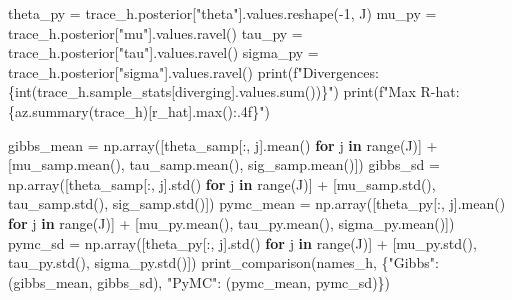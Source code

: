 \documentclass[
  letterpaper,
  DIV=11,
  numbers=noendperiod]{scrartcl}
\newenvironment{Shaded}{\begin{snugshade}}{\end{snugshade}}
\newcommand{\BuiltInTok}[1]{\textcolor[rgb]{0.00,0.23,0.31}{#1}}
\newcommand{\ControlFlowTok}[1]{\textcolor[rgb]{0.00,0.23,0.31}{\textbf{#1}}}
\newcommand{\DecValTok}[1]{\textcolor[rgb]{0.68,0.00,0.00}{#1}}
\newcommand{\KeywordTok}[1]{\textcolor[rgb]{0.00,0.23,0.31}{\textbf{#1}}}
\newcommand{\NormalTok}[1]{\textcolor[rgb]{0.00,0.23,0.31}{#1}}
\newcommand{\OperatorTok}[1]{\textcolor[rgb]{0.37,0.37,0.37}{#1}}
\newcommand{\SpecialCharTok}[1]{\textcolor[rgb]{0.37,0.37,0.37}{#1}}
\newcommand{\SpecialStringTok}[1]{\textcolor[rgb]{0.13,0.47,0.30}{#1}}
\newcommand{\StringTok}[1]{\textcolor[rgb]{0.13,0.47,0.30}{#1}}
\begin{document}
\begin{Shaded}
\begin{Highlighting}[]
\NormalTok{theta\_py }\OperatorTok{=}\NormalTok{ trace\_h.posterior[}\StringTok{"theta"}\NormalTok{].values.reshape(}\OperatorTok{{-}}\DecValTok{1}\NormalTok{, J)}
\NormalTok{mu\_py    }\OperatorTok{=}\NormalTok{ trace\_h.posterior[}\StringTok{"mu"}\NormalTok{].values.ravel()}
\NormalTok{tau\_py   }\OperatorTok{=}\NormalTok{ trace\_h.posterior[}\StringTok{"tau"}\NormalTok{].values.ravel()}
\NormalTok{sigma\_py }\OperatorTok{=}\NormalTok{ trace\_h.posterior[}\StringTok{"sigma"}\NormalTok{].values.ravel()}
\BuiltInTok{print}\NormalTok{(}\SpecialStringTok{f"Divergences: }\SpecialCharTok{\{}\BuiltInTok{int}\NormalTok{(trace\_h.sample\_stats[}\StringTok{\textquotesingle{}diverging\textquotesingle{}}\NormalTok{].values.}\BuiltInTok{sum}\NormalTok{())}\SpecialCharTok{\}}\SpecialStringTok{"}\NormalTok{)}
\BuiltInTok{print}\NormalTok{(}\SpecialStringTok{f"Max R{-}hat: }\SpecialCharTok{\{}\NormalTok{az}\SpecialCharTok{.}\NormalTok{summary(trace\_h)[}\StringTok{\textquotesingle{}r\_hat\textquotesingle{}}\NormalTok{]}\SpecialCharTok{.}\BuiltInTok{max}\NormalTok{()}\SpecialCharTok{:.4f\}}\SpecialStringTok{"}\NormalTok{)}

\NormalTok{gibbs\_mean }\OperatorTok{=}\NormalTok{ np.array([theta\_samp[:, j].mean() }\ControlFlowTok{for}\NormalTok{ j }\KeywordTok{in} \BuiltInTok{range}\NormalTok{(J)]}
                     \OperatorTok{+}\NormalTok{ [mu\_samp.mean(), tau\_samp.mean(), sig\_samp.mean()])}
\NormalTok{gibbs\_sd   }\OperatorTok{=}\NormalTok{ np.array([theta\_samp[:, j].std() }\ControlFlowTok{for}\NormalTok{ j }\KeywordTok{in} \BuiltInTok{range}\NormalTok{(J)]}
                     \OperatorTok{+}\NormalTok{ [mu\_samp.std(),  tau\_samp.std(),  sig\_samp.std()])}
\NormalTok{pymc\_mean  }\OperatorTok{=}\NormalTok{ np.array([theta\_py[:, j].mean() }\ControlFlowTok{for}\NormalTok{ j }\KeywordTok{in} \BuiltInTok{range}\NormalTok{(J)]}
                     \OperatorTok{+}\NormalTok{ [mu\_py.mean(), tau\_py.mean(), sigma\_py.mean()])}
\NormalTok{pymc\_sd    }\OperatorTok{=}\NormalTok{ np.array([theta\_py[:, j].std() }\ControlFlowTok{for}\NormalTok{ j }\KeywordTok{in} \BuiltInTok{range}\NormalTok{(J)]}
                     \OperatorTok{+}\NormalTok{ [mu\_py.std(), tau\_py.std(), sigma\_py.std()])}
\NormalTok{print\_comparison(names\_h, \{}\StringTok{"Gibbs"}\NormalTok{: (gibbs\_mean, gibbs\_sd),}
                           \StringTok{"PyMC"}\NormalTok{:  (pymc\_mean,  pymc\_sd)\})}
\end{Highlighting}
\end{Shaded}
\end{document}

